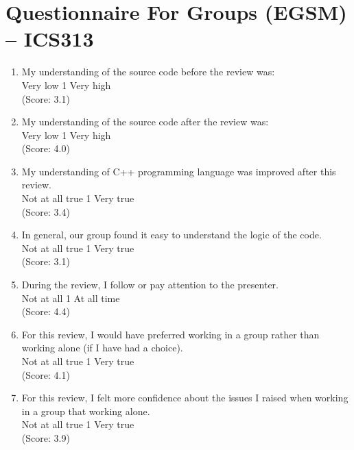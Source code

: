 
\chapter {Questionnaire For Groups (EGSM) -- ICS313}


\begin{enumerate}
\item My understanding of the source code before the review was: 
\\
Very low \hfill 1     \hfill Very high\\
(Score: 3.1)


\item My understanding of the source code after the review was: 
\\
Very low \hfill 1     \hfill Very high\\
(Score: 4.0)


\item My understanding of C++ programming language was improved after
this review.  
\\
Not at all true \hfill 1     \hfill Very true\\
(Score: 3.4)


\item In general, our group found it easy to understand the logic of
the code. 
\\
Not at all true \hfill 1     \hfill Very true\\
(Score: 3.1)


\item During the review, I follow or pay attention to the presenter.
\\
Not at all \hfill 1    
\hfill At all time\\
(Score: 4.4)

\item For this review, I would have preferred working in a group rather 
than working alone (if I have had a choice).
\\
Not at all true \hfill 1     \hfill Very true\\
(Score: 4.1)

\item For this review, I felt more confidence about the issues I raised when 
working in a group that working alone.
\\
Not at all true \hfill 1     \hfill Very true\\
(Score: 3.9)


\end{enumerate}
